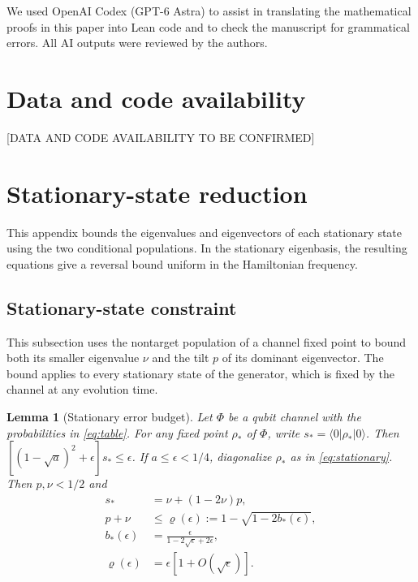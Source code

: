 \documentclass[aps,pra,reprint,amsmath,amssymb,nofootinbib,floatfix,longbibliography]{revtex4-2}
\theoremstyle{aps}
\newtheorem{lemma}[theorem]{Lemma}
\newcommand{\eps}{\epsilon}
\newcommand{\ket}[1]{|#1\rangle}
\newcommand{\bra}[1]{\langle#1|}
\begin{document}
\begin{acknowledgments}
We used OpenAI Codex (GPT-6 Astra) to assist in translating the mathematical proofs in this paper into Lean code and to check the manuscript for grammatical errors. All AI outputs were reviewed by the authors.
\end{acknowledgments}

\section*{Data and code availability}
{ [DATA AND CODE AVAILABILITY TO BE CONFIRMED]\par}

\appendix

\section{Stationary-state reduction}\label{app:stationary}\label{sec:comparison}

This appendix bounds the eigenvalues and eigenvectors of each stationary state using the two conditional populations. In the stationary eigenbasis, the resulting equations give a reversal bound uniform in the Hamiltonian frequency.

\subsection{Stationary-state constraint}

This subsection uses the nontarget population of a channel fixed point to bound both its smaller eigenvalue $\nu$ and the tilt $p$ of its dominant eigenvector. The bound applies to every stationary state of the generator, which is fixed by the channel at any evolution time.

\begin{lemma}[Stationary error budget]\label{lem:budget}
Let $\Phi$ be a qubit channel with the probabilities in \eqref{eq:table}. For any fixed point $\rho_*$ of $\Phi$, write $s_* =\bra0\rho_*\ket0$. Then $[(1-\sqrt a)^2+\eps]s_*\le\eps$.
If $a\le\eps<1/4$, diagonalize
$\rho_*$ as in \eqref{eq:stationary}.
Then $p,\nu<1/2$ and
\begin{align}
 s_*&=\nu+(1-2\nu)p,\label{eq:pstar}\\
 p+\nu&\le\varrho(\eps):=1-\sqrt{1-2b_*(\eps)},\nonumber\\
 b_*(\eps)&=\frac{\eps}{1-2\sqrt\eps+2\eps},\label{eq:rhoepsilon}\\
 \varrho(\eps)&=\eps[1+O(\sqrt\eps)].\nonumber
\end{align}
\end{lemma}
\end{document}
